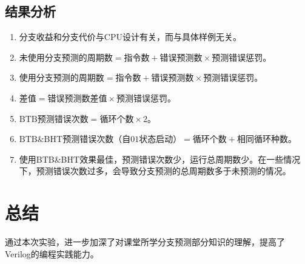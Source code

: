 \documentclass{ctexart}
\begin{document}
\subsection{\hei 结果分析}
\begin{enumerate}
    \item 分支收益和分支代价与CPU设计有关，而与具体样例无关。
    \item $\text{未使用分支预测的周期数}=\text{指令数}+\text{错误预测数}\times\text{预测错误惩罚}$。
    \item $\text{使用分支预测的周期数}=\text{指令数}+\text{错误预测数}\times\text{预测错误惩罚}$。
    \item $\text{差值}=\text{错误预测数差值}\times\text{预测错误惩罚}$。
    \item $\text{BTB预测错误次数}=\text{循环个数}\times2$。
    \item $\text{BTB\&BHT预测错误次数（自01状态启动）}=\text{循环个数}+\text{相同循环种数}$。
    \item 使用BTB\&BHT效果最佳，预测错误次数少，运行总周期数少。在一些情况下，预测错误次数过多，会导致分支预测的总周期数多于未预测的情况。
\end{enumerate}
\section{\hei 总结}
通过本次实验，进一步加深了对课堂所学分支预测部分知识的理解，提高了Verilog的编程实践能力。
\end{document}
